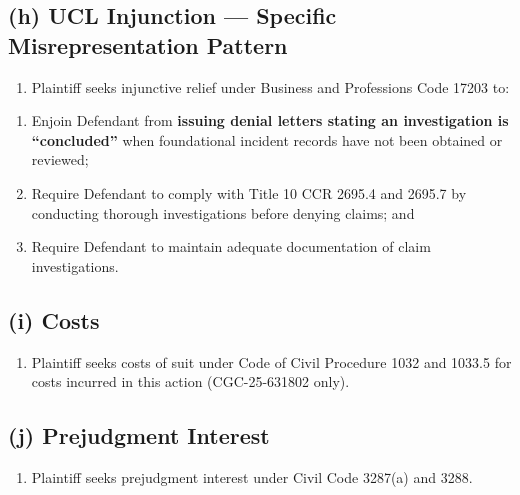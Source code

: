 \subsection{(h) UCL Injunction --- Specific Misrepresentation Pattern}\label{h-ucl-injunction-specific-misrepresentation-pattern}

\begin{enumerate}
\def\labelenumi{\arabic{enumi}.}
\setcounter{enumi}{37}
\tightlist
\item
  Plaintiff seeks injunctive relief under Business and Professions Code \textsection{} 17203 to:
\end{enumerate}

\begin{enumerate}
\def\labelenumi{(\alph{enumi})}
\item
  Enjoin Defendant from \textbf{issuing denial letters stating an investigation is ``concluded''} when foundational incident records have not been obtained or reviewed;
\item
  Require Defendant to comply with Title 10 CCR \textsection{}\textsection{} 2695.4 and 2695.7 by conducting thorough investigations before denying claims; and
\item
  Require Defendant to maintain adequate documentation of claim investigations.
\end{enumerate}

\subsection{(i) Costs}\label{i-costs}

\begin{enumerate}
\def\labelenumi{\arabic{enumi}.}
\setcounter{enumi}{38}
\tightlist
\item
  Plaintiff seeks costs of suit under Code of Civil Procedure \textsection{}\textsection{} 1032 and 1033.5 for costs incurred in this action (CGC-25-631802 only).
\end{enumerate}

\subsection{(j) Prejudgment Interest}\label{j-prejudgment-interest}

\begin{enumerate}
\def\labelenumi{\arabic{enumi}.}
\setcounter{enumi}{39}
\tightlist
\item
  Plaintiff seeks prejudgment interest under Civil Code \textsection{}\textsection{} 3287(a) and 3288.
\end{enumerate}

